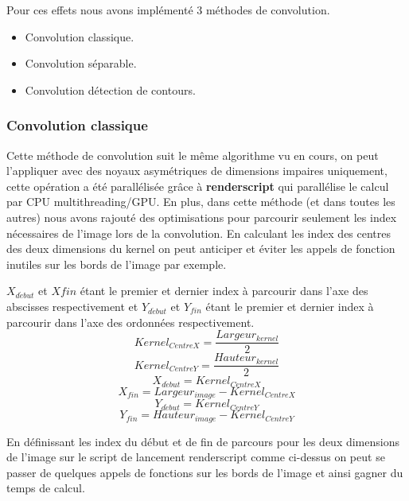     Pour ces effets nous avons implémenté 3 méthodes de convolution.


    \begin{itemize}
        \item Convolution classique.
        \item Convolution séparable.
        \item Convolution détection de contours.
    \end{itemize}
    

    \subsubsection*{Convolution classique} \label{conv_classique}
    
        Cette méthode de convolution suit le même algorithme vu en cours, on peut l'appliquer avec des noyaux asymétriques de dimensions impaires uniquement,
        cette opération a été parallélisée grâce à \textbf{renderscript} qui parallélise le calcul par CPU multithreading/GPU. En plus, dans cette méthode (et dans toutes les autres) nous avons rajouté
        des optimisations pour parcourir seulement les index nécessaires de l'image lors de la convolution. En calculant les index des centres des deux dimensions du kernel
        on peut anticiper et éviter les appels de fonction inutiles sur les bords de l'image par exemple.
        
        $X_{d\acute{e}but}$ et $X{fin}$ étant le premier et dernier index à parcourir dans l'axe des abscisses respectivement et
        $Y_{d\acute{e}but}$ et $Y_{fin}$ étant le premier et dernier index à parcourir dans l'axe des ordonnées respectivement.
        \[
            Kernel_{CentreX} =   \frac{Largeur_{kernel}}{2}            
        \]
        \[
            Kernel_{CentreY} =   \frac{Hauteur_{kernel}}{2}            
        \]
        \[
            X_{d\acute{e}but} = Kernel_{CentreX}      
        \]
        \[
            X_{fin} = Largeur_{image} - Kernel_{CentreX}           
        \]
        \[
            Y_{d\acute{e}but} = Kernel_{CentreY}      
        \]
        \[
            Y_{fin} = Hauteur_{image} - Kernel_{CentreY}           
        \]

        En définissant les index du début et de fin de parcours pour les deux dimensions de l'image sur le script de lancement renderscript
        comme ci-dessus on peut se passer de quelques appels de fonctions sur les bords de l'image et ainsi gagner du temps de calcul.

